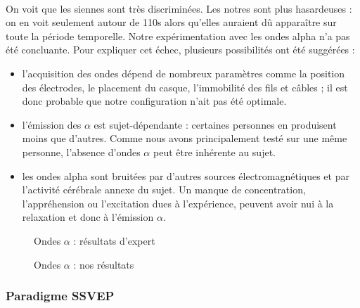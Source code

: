 \documentclass[11pt,a4paper]{article}
\theoremstyle{plain}
\theoremstyle{definition}
\begin{document}
\paragraph{} On voit que les siennes sont très discriminées. Les notres sont plus hasardeuses : on en voit seulement autour de 110s alors qu'elles auraient dû apparaître sur toute la période temporelle. Notre expérimentation avec les ondes alpha n'a pas été concluante. Pour expliquer cet échec, plusieurs possibilités ont été suggérées :
\begin{itemize}
	\item l'acquisition des ondes dépend de nombreux paramètres comme la position des électrodes, le placement du casque, l'immobilité des fils et câbles ; il est donc probable que notre configuration n'ait pas été optimale.
	\item l'émission des $\alpha$ est sujet-dépendante : certaines personnes en produisent moins que d'autres. Comme nous avons principalement testé sur une même personne, l'absence d'ondes $\alpha$ peut être inhérente au sujet.
	\item les ondes alpha sont bruitées par d'autres sources électromagnétiques et par l'activité cérébrale annexe du sujet. Un manque de concentration, l'appréhension ou l'excitation dues à l'expérience, peuvent avoir nui à la relaxation et donc à l'émission $\alpha$.
\end{itemize}



\begin{figure}[h!]
 \begin{minipage}[b]{.46\linewidth}
  \centering{}
  \caption{Ondes $\alpha$ : résultats d'expert \label{eeghack}}
 \end{minipage}
 \begin{minipage}[b]{.46\linewidth}
  \centering{}
  \caption{Ondes $\alpha$ : nos résultats \label{ouralph}}
 \end{minipage}
\end{figure}


\subsubsection{Paradigme SSVEP}
\end{document}
